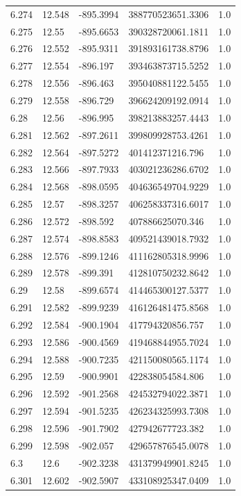 \begin{tabular}{lllll}
6.274 & 12.548 & -895.3994 & 388770523651.3306 & 1.0 \\
6.275 & 12.55 & -895.6653 & 390328720061.1811 & 1.0 \\
6.276 & 12.552 & -895.9311 & 391893161738.8796 & 1.0 \\
6.277 & 12.554 & -896.197 & 393463873715.5252 & 1.0 \\
6.278 & 12.556 & -896.463 & 395040881122.5455 & 1.0 \\
6.279 & 12.558 & -896.729 & 396624209192.0914 & 1.0 \\
6.28 & 12.56 & -896.995 & 398213883257.4443 & 1.0 \\
6.281 & 12.562 & -897.2611 & 399809928753.4261 & 1.0 \\
6.282 & 12.564 & -897.5272 & 401412371216.796 & 1.0 \\
6.283 & 12.566 & -897.7933 & 403021236286.6702 & 1.0 \\
6.284 & 12.568 & -898.0595 & 404636549704.9229 & 1.0 \\
6.285 & 12.57 & -898.3257 & 406258337316.6017 & 1.0 \\
6.286 & 12.572 & -898.592 & 407886625070.346 & 1.0 \\
6.287 & 12.574 & -898.8583 & 409521439018.7932 & 1.0 \\
6.288 & 12.576 & -899.1246 & 411162805318.9996 & 1.0 \\
6.289 & 12.578 & -899.391 & 412810750232.8642 & 1.0 \\
6.29 & 12.58 & -899.6574 & 414465300127.5377 & 1.0 \\
6.291 & 12.582 & -899.9239 & 416126481475.8568 & 1.0 \\
6.292 & 12.584 & -900.1904 & 417794320856.757 & 1.0 \\
6.293 & 12.586 & -900.4569 & 419468844955.7024 & 1.0 \\
6.294 & 12.588 & -900.7235 & 421150080565.1174 & 1.0 \\
6.295 & 12.59 & -900.9901 & 422838054584.806 & 1.0 \\
6.296 & 12.592 & -901.2568 & 424532794022.3871 & 1.0 \\
6.297 & 12.594 & -901.5235 & 426234325993.7308 & 1.0 \\
6.298 & 12.596 & -901.7902 & 427942677723.382 & 1.0 \\
6.299 & 12.598 & -902.057 & 429657876545.0078 & 1.0 \\
6.3 & 12.6 & -902.3238 & 431379949901.8245 & 1.0 \\
6.301 & 12.602 & -902.5907 & 433108925347.0409 & 1.0 \\

\end{tabular}
